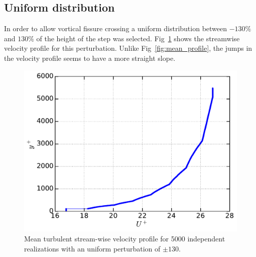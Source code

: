 \documentclass[aps,reprint,amsmath,amssymb,pra]{revtex4-1}%
\begin{document}
\subsection{Uniform distribution}
In order to allow vortical fissure crossing a uniform distribution between $-130\%$ and $130\%$ of the height of the step was selected. Fig~\ref{fig:mp_un130}  shows the streamwise velocity profile for this perturbation. Unlike Fig~\ref{fig:mean_profile}, the jumps in the velocity profile seems to have a more straight slope. 
\begin{figure}[b]
\includegraphics[scale=0.46]{figures/Master_averaged_step_profile_5000_assembles_un130}
\caption{\label{fig:mp_un130} Mean turbulent stream-wise velocity profile for 5000 independent realizations with an uniform perturbation of $\pm 130$.}
\end{figure}

     
\end{document}
